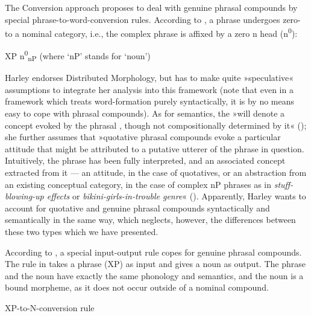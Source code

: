 \documentclass[output=paper]{LSP/langsci}
\begin{document}
The Conversion approach proposes to deal with genuine phrasal
compounds by special phrase-to-word-conversion rules. According to
\citet{Harley2009}, a phrase undergoes zero- to a nominal
category, i.e., the complex phrase is affixed by a zero n head  (n\textsuperscript{0}): 

\ea\label{ex:pafel:37}     
      \glt  {\ob}{\ob}XP{\cb} n\textsuperscript{0}{\cb}\textsubscript{nP}       (where `nP' stands for `noun')
\z 

Harley endorses Distributed Morphology, but has to make quite »speculative« assumptions to integrate her analysis into this framework (note that even in a framework which treats word-formation purely syntactically, it is by no means easy to cope with phrasal compounds). As for semantics, the  »will denote a concept evoked by the phrasal , though not compositionally determined by it« (\citealt[143]{Harley2009}); she further assumes that »quotative phrasal compounds evoke a particular attitude that might be attributed to a putative utterer of the phrase in question. Intuitively, the phrase has been fully interpreted, and an associated concept extracted from it — an attitude, in the case of quotatives, or an abstraction from an existing conceptual category, in the case of complex nP phrases as in \textit{stuff-blowing-up effects} or \textit{bikini-girls-in-trouble genre}« (\citealt[142]{Harley2009}). Apparently, Harley wants to account for quotative and genuine phrasal compounds syntactically and semantically in the same way, which neglects, however, the differences between these two types which we have presented.
 
According to \citet{Pafel2015}, a special input-output rule copes for genuine phrasal compounds. The rule in  takes a phrase (XP) as input and gives a noun as output. The phrase and the noun have exactly the same phonology and semantics, and the noun is a bound morpheme, as it does not occur outside of a nominal compound.

\noindent\parbox{\textwidth}{\ea \label{ex:pafel:pafel:xpton} XP-to-N-conversion rule
\z}
\end{document}
